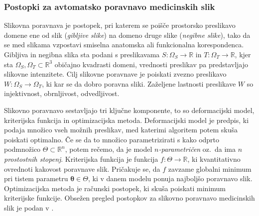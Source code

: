 \documentclass[a4paper,twoside,11pt]{article}
\begin{document}
	\subsubsection*{Postopki za avtomatsko poravnavo medicinskih slik}
	\par{
	  Slikovna poravnava je postopek, pri katerem se poišče prostorsko preslikavo domene ene od slik (\emph{gibljive slike}) na domeno druge slike (\emph{negibne slike}), tako da se med slikama vzpostavi smiselna anatomska ali funkcionalna korespondenca. Gibljiva in negibna slika sta podani s preslikavama $S\colon\Omega_S\rightarrow\mathbb{R}$ in $T\colon\Omega_T\rightarrow\mathbb{R}$, kjer sta $\Omega_S, \Omega_T\subset\mathbb{R}^3$ običajno kvadrasti domeni, vrednosti preslikav pa predstavljajo slikovne intenzitete. Cilj slikovne poravnave je poiskati zvezno preslikavo $W:\Omega_S\rightarrow\Omega_T$, ki kar se da dobro poravna sliki. Zaželjene lastnosti preslikave $W$ so injektivnost, obrnljivost, odvedljivost.
	}
	\par{
	  Slikovno poravnavo sestavljajo tri ključne komponente, to so deformacijski model, kriterijska funkcija in optimizacijska metoda. Deformacijski model je predpis, ki podaja množico vseh možnih preslikav, med katerimi algoritem potem skuša poiskati optimalno. Če se da to množico parametrizirati s kako odprto podmnožico $\Theta\subset\mathbb{R}^n$, potem rečemo, da je model \emph{$n$-parametričen} oz.~da ima \emph{$n$ prostostnih stopenj}. Kriterijska funkcija je funkcija $f\colon\Theta\rightarrow\mathbb{R}$, ki kvantitativno ovrednoti kakovost poravnave slik. Pričakuje se, da $f$ zavzame globalni minimum pri tistem parametru $\mathbf{\theta}\in\Theta$, ki v danem modelu ponuja najboljšo poravnavo slik. Optimizacijska metoda je računski postopek, ki skuša poiskati minimum kriterijske funkcije. Obsežen pregled postopkov za slikovno poravnavo medicinskih slik je podan v \cite{sotiras2013}.
	}
\end{document}
